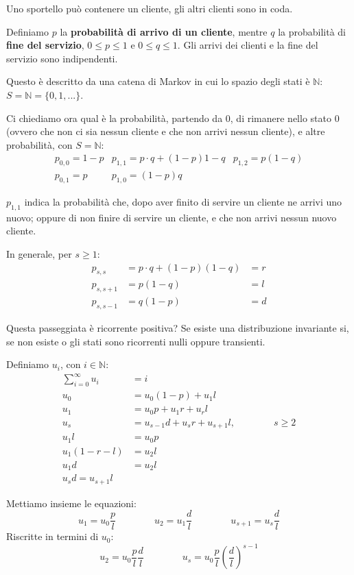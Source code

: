 \documentclass[a4paper,12pt]{book}
\begin{document}
Uno sportello può contenere un cliente, gli altri clienti sono in coda. 

Definiamo $ p $ la \textbf{probabilità di arrivo di un cliente}, mentre $ q $ la probabilità di \textbf{fine del servizio}, $ 0 \le p \le 1 $ e $ 0 \le q \le 1 $. Gli arrivi dei clienti e la fine del servizio sono indipendenti. 

Questo è descritto da una catena di Markov in cui lo spazio degli stati è $ \mathbb{N} $: $ S = \mathbb{N} = \{0, 1, ...\} $.

Ci chiediamo ora qual è la probabilità, partendo da 0, di rimanere nello stato 0 (ovvero che non ci sia nessun cliente e che non arrivi nessun cliente), e altre probabilità, con $ S = \mathbb{N} $:
$$ \begin{array}{ccc}
  p_{0,0} = 1-p & p_{1,1} = p\cdot q + (1-p) 1-q  & p_{1,2} = p(1-q) \\
  p_{0,1} = p & p_{1,0} = (1-p)q & 
\end{array} $$

$ p_{1,1} $ indica la probabilità che, dopo aver finito di servire un cliente ne arrivi uno nuovo; oppure di non finire di servire un cliente, e che non arrivi nessun nuovo cliente. 

In generale, per $ s \ge 1 $:
\begin{align*}
	p_{s,s} & = p\cdot q + (1-p) (1-q) & = r \\
	p_{s,s+1} & = p(1-q) & = l \\ %
	p_{s,s-1} & = q(1-p) & = d
\end{align*}

Questa passeggiata è ricorrente positiva? Se esiste una distribuzione invariante si, se non esiste o gli stati sono ricorrenti nulli oppure transienti. 

Definiamo $ u_i $, con $ i \in \mathbb{N} $:
\begin{align*}
	\sum_{i=0}^{\infty} u_i & = i \\
	u_0 & = u_0(1-p) + u_1 l \\
	u_1 & = u_0 p + u_1 r + u_r l \\
	u_s & = u_{s-1}d + u_s r + u_{s+1} l, \qquad \qquad s \ge 2 \\
	u_1 l & = u_0 p \\
	u_1(1-r-l) & = u_2 l \\
	u_1 d & = u_2 l \\	
	u_s d = u_{s+1} l
\end{align*}

Mettiamo insieme le equazioni:
$$ u_1 = u_0 \frac{p}{l} \qquad \qquad u_2 = u_1\frac{d}{l} \qquad \qquad u_{s+1} = u_s \frac{d}{l} $$
Riscritte in termini di $ u_0 $:
$$ u_2 = u_0 \frac{p}{l}\frac{d}{l} \qquad \qquad u_s = u_0 \frac{p}{l} \left(\frac{d}{l}\right)^{s-1} $$
\end{document}
